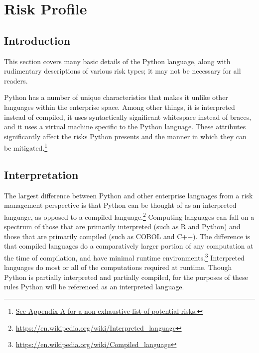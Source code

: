  
\section{Risk Profile}
 
\thispagestyle{section_start_style}
 
    \subsection*{Introduction}

        \begin{tcolorbox}
            This section covers many basic details of the Python language, along with rudimentary descriptions of various risk types; it may not be necessary for all readers.
        \end{tcolorbox}

        Python has a number of unique characteristics that makes it unlike other languages within the enterprise space. Among other things, it is interpreted instead of compiled, it uses syntactically significant whitespace instead of braces, and it uses a virtual machine specific to the Python language. These attributes significantly affect the risks Python presents and the manner in which they can be mitigated.\footnote{\hyperref[sec:appendix_b]{See Appendix A for a non-exhaustive list of potential risks.}}

    \subsection{Interpretation}

        The largest difference between Python and other enterprise languages from a risk management perspective is that Python can be thought of as an interpreted language, as opposed to a compiled language.\footnote{\url{https://en.wikipedia.org/wiki/Interpreted_language}} Computing languages can fall on a spectrum of those that are primarily interpreted (such as R and Python) and those that are primarily compiled (such as COBOL and C++). The difference is that compiled languages do a comparatively larger portion of any computation at the time of compilation, and have minimal runtime environments.\footnote{\url{https://en.wikipedia.org/wiki/Compiled_language}} Interpreted languages do most or all of the computations required at runtime. Though Python is partially interpreted and partially compiled, for the purposes of these rules Python will be referenced as an interpreted language.

